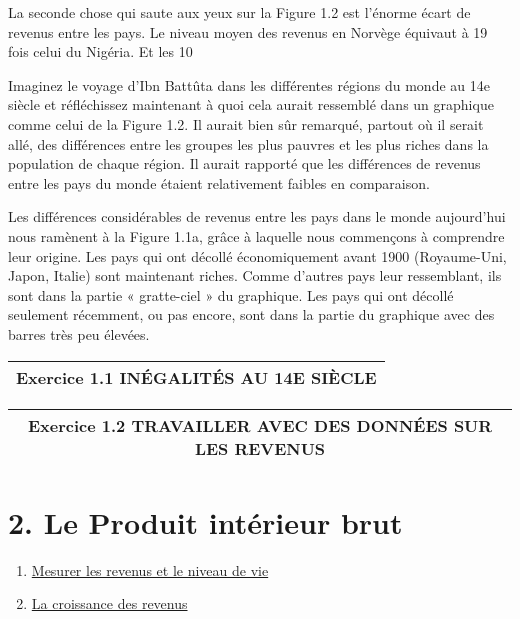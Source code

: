 \documentclass[11pt]{amsart}
\begin{document}
La seconde chose qui saute aux yeux sur la Figure 1.2 est l’énorme écart de revenus entre les pays. Le niveau moyen des revenus en Norvège équivaut à 19 fois celui du Nigéria. Et les 10 %


Imaginez le voyage d’Ibn Battûta dans les différentes régions du monde au 14e siècle et réfléchissez maintenant à quoi cela aurait ressemblé dans un graphique comme celui de la Figure 1.2. Il aurait bien sûr remarqué, partout où il serait allé, des différences entre les groupes les plus pauvres et les plus riches dans la population de chaque région. Il aurait rapporté que les différences de revenus entre les pays du monde étaient relativement faibles en comparaison.


Les différences considérables de revenus entre les pays dans le monde aujourd’hui nous ramènent à la Figure 1.1a, grâce à laquelle nous commençons à comprendre leur origine. Les pays qui ont décollé économiquement avant 1900 (Royaume-Uni, Japon, Italie) sont maintenant riches. Comme d’autres pays leur ressemblant, ils sont dans la partie « gratte-ciel » du graphique. Les pays qui ont décollé seulement récemment, ou pas encore, sont dans la partie du graphique avec des barres très peu élevées.


\begin{center}
\begin{tabular}{|c|}
\hline
\textbf{Exercice 1.1 INÉGALITÉS AU 14E SIÈCLE} \\ 
\hline
\end{tabular}
\end{center}

\begin{center}
\begin{tabular}{|c|}
\hline
\textbf{Exercice 1.2 TRAVAILLER AVEC DES DONNÉES SUR LES REVENUS} \\ 
\hline
\end{tabular}
\end{center}

\hypertarget{x-2.-le-produit-intérieur-brut}{\section*{2. Le Produit intérieur brut}}
\begin{enumerate}

\item{\href{https://www.core-econ.org/the-economy/book/fr/text/01.html#12-mesurer-les-revenus-et-le-niveau-de-vie}{Mesurer les revenus et le niveau de vie}}

\item{\href{https://www.core-econ.org/the-economy/book/fr/text/01.html#13-la-crosse-de-hockey-de-lhistoire-croissance-des-revenus}{La croissance des revenus}}

\end{enumerate}
\end{document}
